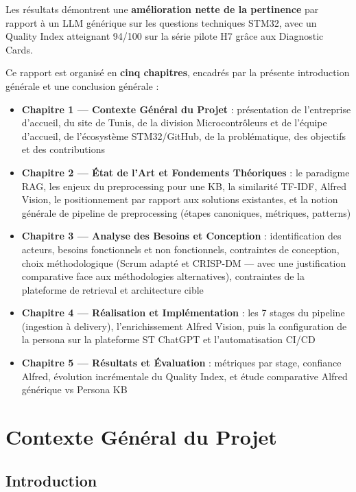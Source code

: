 \documentclass[12pt,a4paper]{report}
\begin{document}
Les résultats démontrent une \textbf{amélioration nette de la pertinence} par rapport à un LLM générique sur les questions techniques STM32, avec un Quality Index atteignant 94/100 sur la série pilote H7 grâce aux Diagnostic Cards.

Ce rapport est organisé en \textbf{cinq chapitres}, encadrés par la présente introduction générale et une conclusion générale :
\begin{itemize}
  \item \textbf{Chapitre 1 --- Contexte Général du Projet} : présentation de l'entreprise d'accueil, du site de Tunis, de la division Microcontrôleurs et de l'équipe d'accueil, de l'écosystème STM32/GitHub, de la problématique, des objectifs et des contributions
  \item \textbf{Chapitre 2 --- État de l'Art et Fondements Théoriques} : le paradigme RAG, les enjeux du preprocessing pour une KB, la similarité TF-IDF, Alfred Vision, le positionnement par rapport aux solutions existantes, et la notion générale de pipeline de preprocessing (étapes canoniques, métriques, patterns)
  \item \textbf{Chapitre 3 --- Analyse des Besoins et Conception} : identification des acteurs, besoins fonctionnels et non fonctionnels, contraintes de conception, choix méthodologique (Scrum adapté et CRISP-DM --- avec une justification comparative face aux méthodologies alternatives), contraintes de la plateforme de retrieval et architecture cible
  \item \textbf{Chapitre 4 --- Réalisation et Implémentation} : les 7 stages du pipeline (ingestion à delivery), l'enrichissement Alfred Vision, puis la configuration de la persona sur la plateforme ST ChatGPT et l'automatisation CI/CD
  \item \textbf{Chapitre 5 --- Résultats et Évaluation} : métriques par stage, confiance Alfred, évolution incrémentale du Quality Index, et étude comparative Alfred générique vs Persona KB
\end{itemize}

\newpage

\chapter{Contexte Général du Projet}
\label{chap:contexte}

\section*{Introduction}
\end{document}
